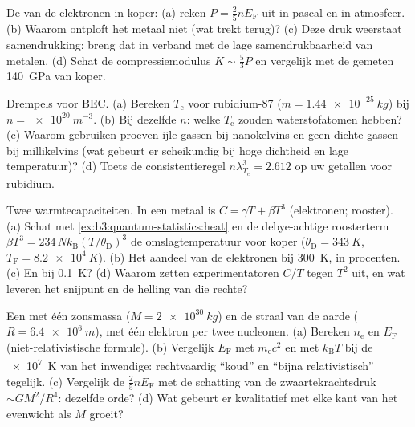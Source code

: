 \begin{exercise}[$\star$]\label{exo:b3:quantum-statistics:3}
De  van de elektronen in koper: (a) reken $P =
\tfrac25 nE_{\text{F}}$ uit in pascal en in atmosfeer. (b) Waarom ontploft het
metaal niet (wat trekt terug)? (c) Deze druk weerstaat samendrukking:
breng dat in verband met de lage samendrukbaarheid van metalen. (d) Schat
de compressiemodulus $K \sim \tfrac53 P$ en vergelijk met de gemeten
\qty{140}{GPa} van koper.
\end{exercise}

\begin{exercise}[$\star$]\label{exo:b3:quantum-statistics:4}
Drempels voor BEC. (a) Bereken $T_{\text{c}}$ voor rubidium-87 ($m =
\qty{1.44e-25}{kg}$) bij $n = \qty{e20}{m^{-3}}$. (b) Bij dezelfde
$n$: welke $T_{\text{c}}$ zouden waterstofatomen hebben? (c) Waarom
gebruiken proeven ijle gassen bij nanokelvins en geen dichte gassen bij
millikelvins (wat gebeurt er scheikundig bij hoge dichtheid en lage
temperatuur)? (d) Toets de consistentieregel $n\lambda_{T_c}^3
= 2.612$ op
uw getallen voor rubidium.
\end{exercise}

\begin{exercise}[$\star\star$]\label{exo:b3:quantum-statistics:5}
Twee warmtecapaciteiten. In een metaal is $C = \gamma T +
\beta T^3$
(elektronen; rooster). (a) Schat met
\cref{ex:b3:quantum-statistics:heat} en de debye-achtige roosterterm
$\beta T^3 = 234\,Nk_{\text{B}}(T/\theta_{\text{D}})^3$ de
omslagtemperatuur voor koper ($\theta_{\text{D}} = \qty{343}{K}$,
$T_{\text{F}} =
\qty{8.2e4}{K}$). (b) Het aandeel van de elektronen bij
\qty{300}{K}, in procenten. (c) En bij \qty{0.1}{K}? (d) Waarom zetten
experimentatoren $C/T$ tegen $T^2$ uit, en wat leveren het snijpunt en de
helling van die rechte?
\end{exercise}

\begin{exercise}[$\star\star$]\label{exo:b3:quantum-statistics:6}
Een  met één zonsmassa ($M = \qty{2e30}{kg}$) en de straal van
de aarde ($R = \qty{6.4e6}{m}$), met één elektron per twee nucleonen. (a)
Bereken $n_{\text{e}}$ en $E_{\text{F}}$ (niet-relativistische formule).
(b) Vergelijk $E_{\text{F}}$ met $m_{\text{e}}c^2$ en met $k_{\text{B}}T$
bij de \qty{e7}{K} van het inwendige: rechtvaardig ``koud'' en ``bijna
relativistisch'' tegelijk. (c) Vergelijk de  $\tfrac25 nE_{\text{F}}$ met de schatting van de zwaartekrachtsdruk $\sim GM^2/R^4$:
dezelfde orde? (d) Wat gebeurt er kwalitatief met elke kant van het
evenwicht als $M$ groeit?
\end{exercise}

